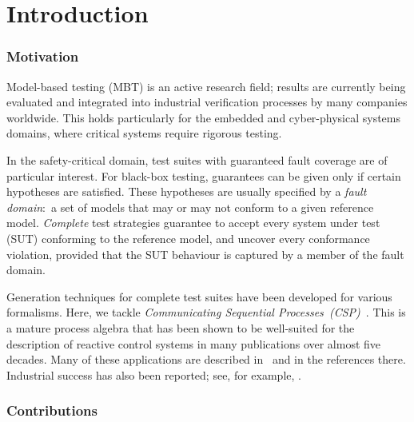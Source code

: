 
\section{Introduction}
\label{sec:intro}


\subsubsection*{Motivation}

Model-based testing (MBT) is an active research field; results are currently
being evaluated and integrated into industrial verification processes by many
companies worldwide. This holds particularly for the embedded and
cyber-physical systems domains, where critical systems require rigorous
testing.

In the safety-critical domain, test suites with guaranteed fault coverage are
of particular interest. For black-box testing, guarantees can be given only
if certain hypotheses are satisfied. These hypotheses are usually specified
by a \emph{fault domain}:~a set of models that may or may not conform to a
given reference model. \emph{Complete} test strategies guarantee to accept
every  system under test (SUT) conforming to the reference model, and uncover
every conformance violation, provided that the SUT behaviour is captured by a
member of the fault domain.

Generation techniques for complete test suites have been developed for
various formalisms. Here, we tackle \emph{Communicating Sequential
Processes~(CSP)}~\cite{Hoare:1985:CSP:3921,Roscoe2010}. This is a mature
process algebra that has been shown to be well-suited for the description of
reactive control systems in many publications over almost five decades. Many
of these applications are described in~\cite{Roscoe2010} and in the
references there. Industrial success has also been reported; see, for
example, \cite{976937,DBLP:conf/prdc/ShiPK99,DBLP:conf/amast/ButhKPS97}.


\subsubsection*{Contributions}

